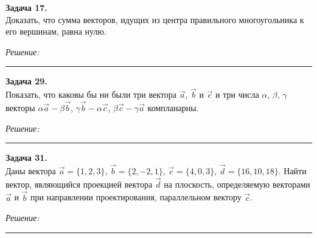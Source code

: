 \documentclass[a4paper, 12pt]{article}
\newenvironment{problem}[2][Задача]
{ \begin{mdframed}[backgroundcolor=gray!10] \textbf{#1 #2.} \\}
	{  \end{mdframed}}
\newenvironment{solution}
{\textit{Решение:}\vspace{.1cm}\\}
{\vspace{.1cm}\noindent\rule{7in}{1.5pt}}
\begin{document}
\begin{problem}{17}
Доказать, что сумма векторов, идущих из центра правильного многоугольника к его вершинам, равна нулю.

\end{problem}
\begin{solution}


\end{solution} 

\begin{problem}{29}
Показать, что каковы бы ни были три вектора $\vec a$, $\vec b$ и $\vec c$ и три числа $\alpha$, $\beta$, $\gamma$
векторы $\alpha\vec{a}-\beta\vec{b}$, $\gamma\vec{b}-\alpha\vec{c}$,
$\beta\vec{c}-\gamma\vec{a}$ компланарны.

\end{problem}
\begin{solution}


\end{solution} 

\begin{problem}{31}
Даны вектора $\vec{a}=\{1,2,3\}$, $\vec{b}=\{2,-2,1\}$, $\vec{c}=\{4,0,3\}$, $\vec{d}=\{16,10,18\}$.
Найти вектор, являющийся проекцией вектора $\vec d$ на плоскость, определяемую векторами
$\vec a$ и $\vec b$ при направлении проектирования, параллельном вектору $\vec c$.

\end{problem}
\begin{solution}


\end{solution} 
\end{document}
